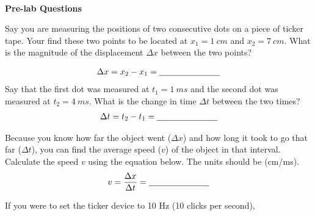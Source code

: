 \textbf{\\\Large Pre-lab Questions\\}

\begin{questions}

\question[\half] Say you are measuring the positions of two consecutive dots on a piece of ticker tape. Your find these two points to be located at $x_1=\SI{1}{cm}$ and $x_2=\SI{7}{cm}$. What is the magnitude of the displacement $\Delta x$ between the two points?  
\qsp

\begin{align*}
\Delta x = x_2 - x_1 = \underline{\hspace{2.5cm}}
\end{align*}
\newpage
\question[\half] Say that the first dot was measured at $t_1=\SI{1}{ms}$ and the second dot was measured at $t_2=\SI{4}{ms}$. What is the change in time $\Delta t$ between the two times?
\qsp
\begin{align*}
\Delta t = t_2 - t_1 = \underline{\hspace{2.5cm}}
\end{align*}

\question[1] Because you know how far the object went ($\Delta x$) and how long it took to go that far ($\Delta t$), you can find the average speed ($v$) of the object in that interval. Calculate the speed $v$ using the equation below. The units should be (cm/ms). \\[0.5cm]
\begin{align*}
v = \frac{\Delta x}{\Delta t} = \underline{\hspace{2.5cm}}
\end{align*}
\newline


\question[1] If you were to set the ticker device to 10 Hz (10 clicks per second),



\end{questions}
